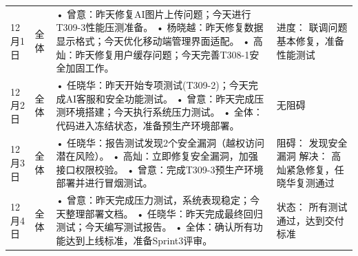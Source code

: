 \begin{levellist}
\begin{longtable}{>{\centering\arraybackslash}m{1cm} >{\centering\arraybackslash}m{1cm} >{\centering\arraybackslash}m{9cm} >{\centering\arraybackslash}m{2.5cm}}
        12月1日                                                                                          & 全体                             & • 曾意：昨天修复AI图片上传问题；今天进行T309-3性能压测准备。 \newline
        • 杨晓越：昨天修复数据显示格式；今天优化移动端管理界面适配。 \newline
        • 高灿：昨天修复用户缓存问题；今天完善T308-1安全加固工作。                                                              & 进度： 联调问题基本修复，准备性能测试                                                                                                  \\
        12月2日                                                                                          & 全体                             & • 任晓华：昨天开始专项测试(T309-2)；今天完成AI客服和安全功能测试。 \newline
        • 曾意：昨天完成压测环境搭建；今天执行系统压力测试。 \newline
        • 全体：代码进入冻结状态，准备预生产环境部署。                                                                       & 无阻碍                                                                                                                  \\
        12月3日                                                                                          & 全体                             & • 任晓华：报告测试发现2个安全漏洞（越权访问潜在风险）。 \newline
        • 高灿：立即修复安全漏洞，加强接口权限校验。 \newline
        • 曾意：完成T309-3预生产环境部署并进行冒烟测试。                                                                   & 阻碍： 发现安全漏洞 \newline
        解决： 高灿紧急修复，任晓华复测通过                                                                                                                                                                                                    \\
        12月4日                                                                                          & 全体                             & • 曾意：昨天完成压力测试，系统表现稳定；今天整理部署文档。 \newline
        • 任晓华：昨天完成最终回归测试；今天编写测试报告。 \newline
        • 全体：确认所有功能达到上线标准，准备Sprint3评审。                                                                 & 状态： 所有测试通过，达到交付标准                                                                                                    \\

\end{longtable}
\end{levellist}
